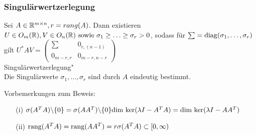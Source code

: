 \subsubsection{Singulärwertzerlegung}
\begin{Satz}
	Sei $A \in \mathbb R^{m \times n}, r=rang(A)$. Dann existieren $U \in O_m(\mathbb R), V \in O_n(\mathbb R) \text{ sowie } \sigma_1 \ge \ldots \ge \sigma_r>0$, sodass für $\sum=\operatorname*{\mathrm{diag}}(\sigma_1,\ldots,\sigma_r)$ gilt $U^*AV=\begin{pmatrix}
	\sum & 0_{r,(n-1)}\\
	0_{m-r,r} & 0_{m-r,n-r}
	\end{pmatrix}$\\\glqq Singulärwertzerlegung"\\
	Die Singulärwerte $\sigma_1,\ldots,\sigma_r$ sind durch $A$ eindeutig bestimmt.
\end{Satz}
Vorbemerkungen zum Beweis:\\
\begin{itemize}
	\item[(i)]$\sigma(A^TA)\backslash\{0\} = \sigma(AA^T)\backslash\{0\}\\ \text{dim ker}(\lambda I-A^TA)=\text{dim ker}(\lambda I-AA^T)$
	\item[(ii)]$\operatorname*{\mathrm{rang}}(A^TA) = \operatorname*{\mathrm{rang}}(AA^T)=r\\ \sigma(A^TA) \subset [0,\infty)$
\end{itemize}
